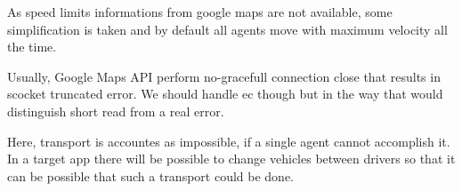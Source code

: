 
\begin{DoxyRefList}
\item[Member \mbox{\hyperlink{class_agent_a80c835ccbc46ed8c16bbd02b376bec29}{Agent::Agent}} (const std\+::string \&home, unsigned int id, boost\+::property\+\_\+tree\+::ptree params)]\label{todo__todo000003}%
%
As speed limits informations from google maps are not available, some simplification is taken and by default all agents move with maximum velocity all the time. 
\item[Member \mbox{\hyperlink{class_agent_aa9c61eb7dc30204069ea99054c0f66ac}{Agent::initialize\+Transport}} (\mbox{\hyperlink{class_transport}{Transport}} $\ast$transport, const std\+::string \&origin, const std\+::string \&destination, unsigned int load, boost\+::property\+\_\+tree\+::ptree map\+\_\+params)]\label{todo__todo000004}%
%
Usually, Google Maps A\+PI perform no-\/gracefull connection close that results in \textquotesingle{}scocket truncated\textquotesingle{} error. We should handle ec though but in the way that would distinguish short read from a real error. 

\label{todo__todo000005}%
%
Here, transport is accountes as impossible, if a single agent cannot accomplish it. In a target app there will be possible to change vehicles between drivers so that it can be possible that such a transport could be done. 


\end{DoxyRefList}
